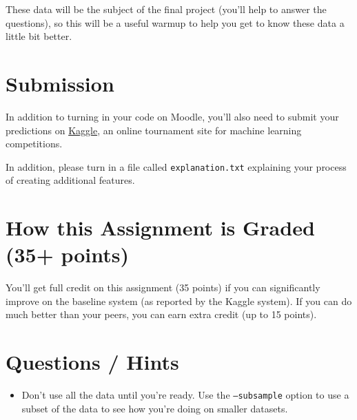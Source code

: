 \documentclass[11pt]{article}
\begin{document}
These data will be the subject of the final project (you'll help to answer the questions), so this will be a useful warmup to help you get to know these data a little bit better.

\section*{Submission}

In addition to turning in your code on Moodle, you'll also need to submit your predictions on \href{https://inclass.kaggle.com/c/cmsc-5832-classification}{Kaggle}, an online tournament site for machine learning competitions.  

In addition, please turn in a file called \texttt{explanation.txt} explaining your process of creating additional features.

\section*{How this Assignment is Graded (35+ points)}

You'll get full credit on this assignment (35 points) if you can significantly improve on the baseline system (as reported by the Kaggle system).  If you can do much better than your peers, you can earn extra credit (up to 15 points).

\section*{Questions / Hints}

\begin{itemize}
	\item Don't use all the data until you're ready.  Use the \texttt{--subsample} option to use a subset of the data to see how you're doing on smaller datasets.
\end{itemize}
\end{document}
